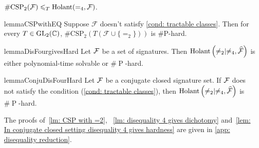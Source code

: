 \begin{lemma}\label{lm: CSP2 to holant =4}
    $\#\mathrm{CSP}_2(\mathcal{F})\leqslant_T\operatorname{Holant}(=_4, \mathcal F)$.
\end{lemma}

\begin{restatable}{lemma}{CSPwithEQ}\label{lm: CSP with =2}
    Suppose $\mathcal{F}$ doesn't satisfy \eqref{cond: tractable classes}.
    Then for every $T\in \mathrm{GL}_2(\mathbb{C})$, $\#\mathrm{CSP}_2(T(\mathcal{F}\cup \{=_2\}))$ is \#P-hard.
\end{restatable}

\begin{restatable}{lemma}{DisFourgivesHard}\label{lm: disequality 4 gives dichotomy}
    Let $\mathcal{F}$ be a set of signatures. Then $\operatorname{Holant}\left(\neq_2\mid \neq_4,\widehat{\mathcal{F}}\right)$ is either polynomial-time solvable or $\#\operatorname{P}$-hard.
\end{restatable}


\begin{restatable}{lemma}{ConjuDisFourHard}\label{lem: In conjugate closed setting disequality 4 gives hardness}
    Let $\mathcal{F}$ be a conjugate closed signature set. If $\mathcal{F}$ does not satisfy the condition \rm{(\ref{cond: tractable classes})}, then $\operatorname{Holant}\left(\neq_2\mid \neq_4,\widehat{\mathcal{F}}\right)$ is $\#\operatorname{P}$-hard.
\end{restatable}

The proofs of~\cref{lm: CSP with =2}, ~\cref{lm: disequality 4 gives dichotomy} and~\cref{lem: In conjugate closed setting disequality 4 gives hardness} are given in \autoref{app: disequality reduction}.
